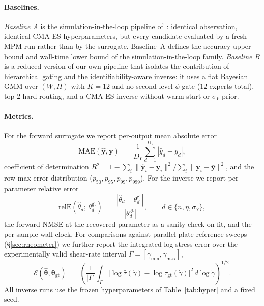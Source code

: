 \paragraph{Baselines.}
\emph{Baseline A} is the simulation-in-the-loop pipeline
of~\cite{hamamichi2023nonnewtonian}: identical observation, identical
CMA-ES hyperparameters, but every candidate evaluated by a fresh MPM
run rather than by the surrogate. Baseline~A defines the accuracy
upper bound and wall-time lower bound of the simulation-in-the-loop
family. \emph{Baseline B} is a reduced version of our own pipeline
that isolates the contribution of hierarchical gating and the
identifiability-aware inverse: it uses a flat Bayesian GMM over
$(W, H)$ with $K = 12$ and no second-level $\phi$ gate ($12$ experts
total), top-$2$ hard routing, and a CMA-ES inverse without warm-start
or $\sigma_Y$ prior.

\paragraph{Metrics.}
For the forward surrogate we report per-output mean absolute error
\begin{equation}
\label{eq:mae}
    \mathrm{MAE}(\hat{\mathbf{y}}, \mathbf{y})
    \;=\; \frac{1}{D_Y}\sum_{d=1}^{D_Y}|\hat y_d - y_d|,
\end{equation}
coefficient of determination $R^{2} = 1 - \sum_{i}
\|\hat{\mathbf{y}}_i - \mathbf{y}_i\|^2 / \sum_i \|\mathbf{y}_i -
\bar{\mathbf{y}}\|^2$, and the row-max error distribution
($p_{50}, p_{95}, p_{99}, p_{999}$). For the inverse we report
per-parameter relative error
\begin{equation}
\label{eq:relE}
    \mathrm{relE}(\hat\theta_d;\,\theta_d^{\mathrm{gt}})
    \;=\; \frac{|\hat\theta_d - \theta_d^{\mathrm{gt}}|}
               {|\theta_d^{\mathrm{gt}}|},
    \qquad d \in \{n, \eta, \sigma_Y\},
\end{equation}
the forward NMSE at the recovered parameter as a sanity check on
fit, and the per-sample wall-clock. For comparisons against
parallel-plate reference sweeps (\S\ref{sec:rheometer}) we further
report the integrated log-stress error over the experimentally valid
shear-rate interval $\Gamma = [\dot\gamma_{\min}, \dot\gamma_{\max}]$,
\begin{equation}
\label{eq:E}
    \mathcal{E}(\hat{\boldsymbol{\theta}}, \boldsymbol{\theta}_{\mathrm{gt}})
    \;=\;
    \left(\frac{1}{|\Gamma|}
    \int_{\Gamma}
      \bigl[\log\hat\tau(\dot\gamma)
          - \log\tau_{\mathrm{gt}}(\dot\gamma)\bigr]^{2}
    \,d\log\dot\gamma\right)^{\!1/2}.
\end{equation}
All inverse runs use the frozen hyperparameters of
Table~\ref{tab:hyper} and a fixed seed.


